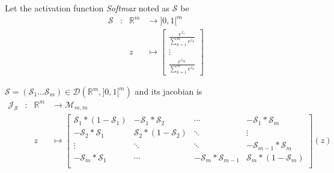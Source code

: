 \documentclass[11pt,en]{elegantpaper}
\newcommand{\Real}{\mathbb{R}}
\begin{document}
\begin{definition}
  Let the activation function \textit{Softmax} noted as $\mathcal{S}$ be
  \begin{equation*}
    \begin{array}{llll}
      \mathcal{S} & : & \Real^m & \longrightarrow ]0,1[^m \\
      &   & z & \longmapsto \begin{bmatrix}
        \frac{e^{z_1}}{\sum_{k=1}^m e^{z_k}} \\
        \vdots \\
        \frac{e^{z_m}}{\sum_{k=1}^m e^{z_k}}
      \end{bmatrix}
    \end{array}
  \end{equation*} \par
\end{definition}

\begin{proposition}
  {\normalfont
    $\mathcal{S} = (\mathcal{S}_1 \ldots \mathcal{S}_m) \in \mathcal{D}(\Real^m,]0,1[^m)$ and its jacobian is \begin{equation} \label{prop:softmax_differential}
      \begin{array}{llll}
        \mathcal{J}_{\mathcal{S}} & : & \Real^m  & \longrightarrow \mathcal{M}_{m,m} \\
        &   & z & \longmapsto \begin{bmatrix}
          \mathcal{S}_1 * (1 - \mathcal{S}_1) & - \mathcal{S}_1 * \mathcal{S}_2 & \cdots & - \mathcal{S}_1 * \mathcal{S}_m \\
          - \mathcal{S}_2 * \mathcal{S}_1 & \mathcal{S}_2 * (1 - \mathcal{S}_2) & \ddots & \vdots \\
          \vdots & \ddots & \ddots & - \mathcal{S}_{m-1} * \mathcal{S}_m \\
          - \mathcal{S}_m * \mathcal{S}_1 & \cdots & - \mathcal{S}_m * \mathcal{S}_{m-1} & \mathcal{S}_m * (1 - \mathcal{S}_m) \\
        \end{bmatrix} (z)
      \end{array}
    \end{equation}
  }
\end{proposition}
\end{document}
